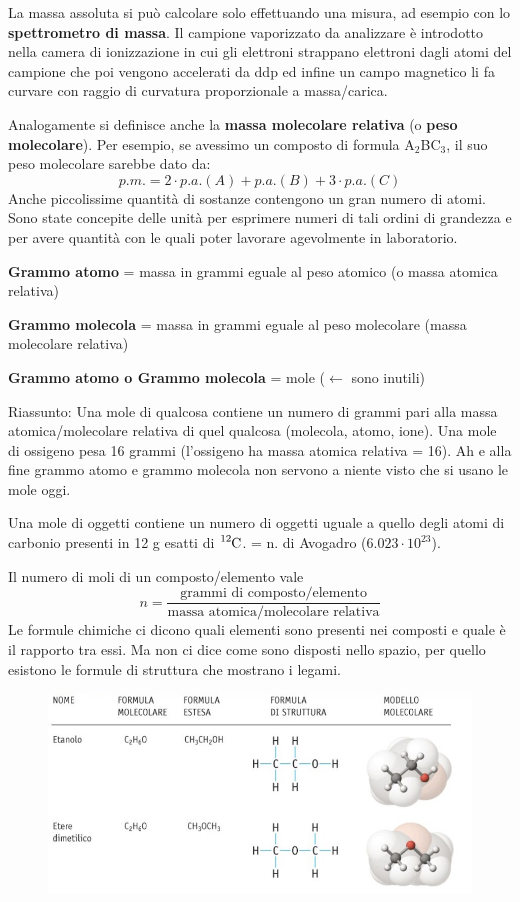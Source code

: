 La massa assoluta si può calcolare solo effettuando una misura, ad esempio con lo \textbf{spettrometro di massa}. Il campione vaporizzato da analizzare è introdotto nella camera di ionizzazione in cui gli elettroni strappano elettroni dagli atomi del campione che poi vengono accelerati da ddp ed infine un campo magnetico li fa curvare con raggio di curvatura proporzionale a massa/carica.

Analogamente si definisce anche la \textbf{massa molecolare relativa} (o \textbf{peso molecolare}). Per esempio, se avessimo un composto di formula A$_2$BC$_3$, il suo peso molecolare sarebbe dato da:
$$p.m.= 2\cdot p.a.(A) + p.a.(B)+ 3\cdot p.a.(C)$$
Anche piccolissime quantità di sostanze contengono un gran numero di atomi.
Sono state concepite delle unità per esprimere numeri di tali ordini di grandezza e per avere quantità con le quali poter lavorare agevolmente in laboratorio.

\textbf{Grammo atomo} = massa in grammi eguale al peso atomico (o 
massa atomica relativa)

\textbf{Grammo molecola} = massa in grammi eguale al peso molecolare (massa molecolare relativa)

\textbf{Grammo atomo o Grammo molecola} = mole ($\leftarrow$ sono inutili)

Riassunto: Una mole di qualcosa contiene un numero di grammi pari alla massa atomica/molecolare relativa  di quel qualcosa (molecola,  atomo, ione). Una mole di ossigeno pesa 16 grammi (l'ossigeno ha massa atomica relativa = 16). Ah e alla fine grammo atomo e grammo molecola non servono a niente visto che si usano le mole oggi.

Una mole di oggetti contiene un numero di oggetti uguale a quello degli atomi di carbonio presenti in 12 g esatti di \(\ce{ ^{12}C }\). = n. di Avogadro ($6.023 \cdot 10^{23}$).

Il numero di moli di un composto/elemento vale
$$n=\frac{\text{grammi di composto/elemento}}{\text{massa atomica/molecolare relativa}}$$
Le formule chimiche ci dicono quali elementi sono presenti nei composti e quale è il rapporto tra essi. Ma non ci dice come sono disposti nello spazio, per quello esistono le formule di struttura che mostrano i legami.
\begin{figure}[htp]
    \centering
    \includegraphics[width=16cm]{immagini/formula.jpg}
\end{figure}\\